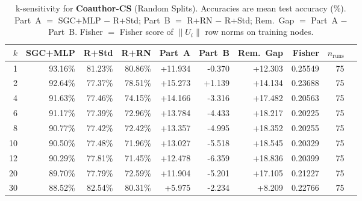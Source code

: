 \begin{table}[t]
\centering\small\setlength{\tabcolsep}{5pt}
\caption{k-sensitivity for \textbf{Coauthor-CS} (Random Splits). Accuracies are mean test accuracy (\%). Part~A $=$ SGC+MLP $-$ R+Std; Part~B $=$ R+RN $-$ R+Std; Rem.~Gap $=$ Part~A $-$ Part~B. Fisher $=$ Fisher score of $\|U_i\|$ row norms on training nodes.}
\label{tab:exp8_per_dataset_coauthor-cs_random}
\begin{tabular}{rrrrrrrrrr}
\toprule
$k$ & SGC+MLP & R+Std & R+RN & Part~A & Part~B & Rem.~Gap & Fisher & $n_{\mathrm{runs}}$ \\
\midrule
1 & 93.16\% & 81.23\% & 80.86\% & +11.934 & -0.370 & +12.303 & 0.25549 & 75 \\
2 & 92.64\% & 77.37\% & 78.51\% & +15.273 & +1.139 & +14.134 & 0.23688 & 75 \\
4 & 91.63\% & 77.46\% & 74.15\% & +14.166 & -3.316 & +17.482 & 0.20563 & 75 \\
6 & 91.17\% & 77.39\% & 72.96\% & +13.784 & -4.433 & +18.217 & 0.20225 & 75 \\
8 & 90.77\% & 77.42\% & 72.42\% & +13.357 & -4.995 & +18.352 & 0.20255 & 75 \\
10 & 90.50\% & 77.48\% & 71.96\% & +13.027 & -5.518 & +18.545 & 0.20329 & 75 \\
12 & 90.29\% & 77.81\% & 71.45\% & +12.478 & -6.359 & +18.836 & 0.20399 & 75 \\
20 & 89.70\% & 77.79\% & 72.59\% & +11.904 & -5.201 & +17.105 & 0.21227 & 75 \\
30 & 88.52\% & 82.54\% & 80.31\% & +5.975 & -2.234 & +8.209 & 0.22766 & 75 \\
\bottomrule
\end{tabular}
\end{table}
